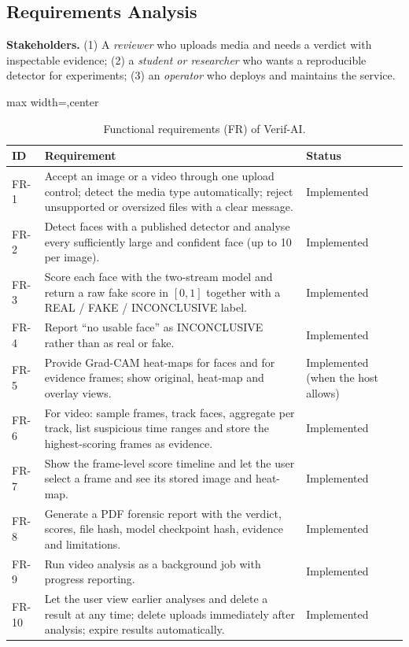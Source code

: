 \subsection{Requirements Analysis}
\textbf{Stakeholders.} (1) A \emph{reviewer} who uploads media and needs a verdict with inspectable evidence; (2) a \emph{student or researcher}
who wants a reproducible detector for experiments; (3) an \emph{operator} who deploys and maintains the service.

\begin{table}[ht]
\centering
\caption{Functional requirements (FR) of Verif-AI.}
\label{tab:fr}
\small
\begin{adjustbox}{max width=\linewidth,center}
\begin{tabular}{|p{1.0cm}|p{8.6cm}|p{2.3cm}|}
\hline
\textbf{ID} & \textbf{Requirement} & \textbf{Status} \\ \hline
FR-1 & Accept an image or a video through one upload control; detect the media type automatically; reject unsupported or oversized files with a clear message. & Implemented \\ \hline
FR-2 & Detect faces with a published detector and analyse every sufficiently large and confident face (up to 10 per image). & Implemented \\ \hline
FR-3 & Score each face with the two-stream model and return a raw fake score in $[0,1]$ together with a REAL / FAKE / INCONCLUSIVE label. & Implemented \\ \hline
FR-4 & Report ``no usable face'' as INCONCLUSIVE rather than as real or fake. & Implemented \\ \hline
FR-5 & Provide Grad-CAM heat-maps for faces and for evidence frames; show original, heat-map and overlay views. & Implemented (when the host allows) \\ \hline
FR-6 & For video: sample frames, track faces, aggregate per track, list suspicious time ranges and store the highest-scoring frames as evidence. & Implemented \\ \hline
FR-7 & Show the frame-level score timeline and let the user select a frame and see its stored image and heat-map. & Implemented \\ \hline
FR-8 & Generate a PDF forensic report with the verdict, scores, file hash, model checkpoint hash, evidence and limitations. & Implemented \\ \hline
FR-9 & Run video analysis as a background job with progress reporting. & Implemented \\ \hline
FR-10 & Let the user view earlier analyses and delete a result at any time; delete uploads immediately after analysis; expire results automatically. & Implemented \\ \hline

\end{tabular}
\end{adjustbox}
\end{table}
